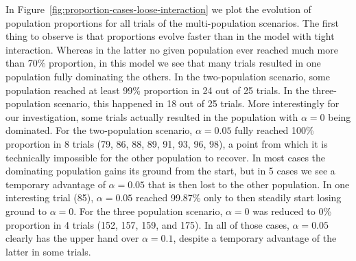 \documentclass[a4paper]{article}
\begin{document}
In Figure~\ref{fig:proportion-cases-loose-interaction} we plot the evolution of population proportions for all trials of the multi-population scenarios.
The first thing to observe is that proportions evolve faster than in the model with tight interaction.
Whereas in the latter no given population ever reached much more than 70\% proportion, in this model we see that many trials resulted in one population fully dominating the others.
In the two-population scenario, some population reached at least 99\% proportion in 24 out of 25 trials.
In the three-population scenario, this happened in 18 out of 25 trials.
More interestingly for our investigation, some trials actually resulted in the population with $\alpha = 0$ being dominated.
For the two-population scenario, $\alpha = 0.05$ fully reached 100\% proportion in 8 trials (79, 86, 88, 89, 91, 93, 96, 98), a point from which it is technically impossible for the other population to recover.
In most cases the dominating population gains its ground from the start, but in 5 cases we see a temporary advantage of $\alpha = 0.05$ that is then lost to the other population.
In one interesting trial (85), $\alpha = 0.05$ reached 99.87\% only to then steadily start losing ground to $\alpha = 0$.
For the three population scenario, $\alpha = 0$ was reduced to 0\% proportion in 4 trials (152, 157, 159, and 175).
In all of those cases, $\alpha = 0.05$ clearly has the upper hand over $\alpha = 0.1$, despite a temporary advantage of the latter in some trials.
\end{document}
